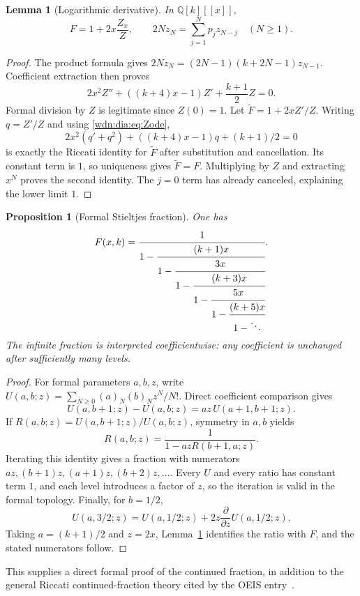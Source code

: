 \documentclass[11pt,letterpaper]{article}
\newtheorem{lemma}[theorem]{Lemma}
\newtheorem{proposition}[theorem]{Proposition}
\theoremstyle{remark}\newtheorem{remark}[theorem]{Remark}
\newcommand{\Q}{\mathbb Q}
\begin{document}
\begin{lemma}[Logarithmic derivative]\label{wdn:dia:lem:logder}
In $\Q[k][[x]]$,
\begin{equation}\label{wdn:dia:eq:logder}
 F=1+2x\frac{Z_x}{Z},\qquad
 2Nz_N=\sum_{j=1}^Np_jz_{N-j}\quad(N\ge1).
\end{equation}
\end{lemma}
\begin{proof}
The product formula gives
$2Nz_N=(2N-1)(k+2N-1)z_{N-1}$. Coefficient extraction then proves
\begin{equation}\label{wdn:dia:eq:Zode}
 2x^2Z''+((k+4)x-1)Z'+\frac{k+1}{2}Z=0.
\end{equation}
Formal division by $Z$ is legitimate since $Z(0)=1$. Let
$\widetilde F=1+2xZ'/Z$. Writing $q=Z'/Z$ and using \eqref{wdn:dia:eq:Zode},
\[
 2x^2(q'+q^2)+((k+4)x-1)q+(k+1)/2=0
\]
is exactly the Riccati identity for $\widetilde F$ after substitution and
cancellation. Its constant term is $1$, so uniqueness gives
$\widetilde F=F$. Multiplying by $Z$ and extracting $x^N$ proves the second
identity. The $j=0$ term has already canceled, explaining the lower limit $1$.
\end{proof}

\begin{proposition}[Formal Stieltjes fraction]\label{wdn:dia:prop:CF}
One has
\begin{equation}\label{wdn:dia:eq:cf}
 F(x,k)=\cfrac1{1-\cfrac{(k+1)x}{1-\cfrac{3x}{1-\cfrac{(k+3)x}{1-\cfrac{5x}{1-\cfrac{(k+5)x}{1-\ddots}}}}}}.
\end{equation}
The infinite fraction is interpreted coefficientwise: any coefficient is
unchanged after sufficiently many levels.
\end{proposition}
\begin{proof}
For formal parameters $a,b,z$, write
$U(a,b;z)=\sum_{N\ge0}(a)_N(b)_Nz^N/N!$. Direct coefficient comparison gives
\[
 U(a,b+1;z)-U(a,b;z)=az\,U(a+1,b+1;z).
\]
If $R(a,b;z)=U(a,b+1;z)/U(a,b;z)$, symmetry in $a,b$ yields
\[
 R(a,b;z)=\frac1{1-azR(b+1,a;z)}.
\]
Iterating this identity gives a fraction with numerators
$az,(b+1)z,(a+1)z,(b+2)z,\ldots$. Every $U$ and every ratio has constant
term $1$, and each level introduces a factor of $z$, so the iteration is
valid in the formal topology. Finally, for $b=1/2$,
\[
 U(a,3/2;z)=U(a,1/2;z)+2z\frac{\partial}{\partial z}U(a,1/2;z).
\]
Taking $a=(k+1)/2$ and $z=2x$, Lemma~\ref{wdn:dia:lem:logder} identifies the ratio
with $F$, and the stated numerators follow.
\end{proof}
This supplies a direct formal proof of the continued fraction, in addition
to the general Riccati continued-fraction theory cited by the OEIS
entry~\cite{Stokes}.
\end{document}
